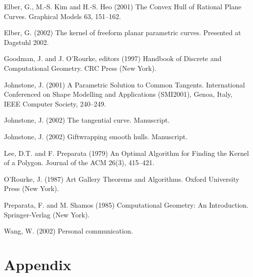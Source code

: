 \documentclass[12pt]{article}
\begin{document}

\begin{thebibliography}{Johnstone 02a}

Elber, G., M.-S. Kim and H.-S. Heo (2001)
The Convex Hull of Rational Plane Curves.
Graphical Models 63, 151--162.

Elber, G. (2002)
The kernel of freeform planar parametric curves.
Presented at Dagstuhl 2002.

Goodman, J. and J. O'Rourke, editors (1997)
Handbook of Discrete and Computational Geometry.
CRC Press (New York).

Johnstone, J. (2001)
A Parametric Solution to Common Tangents.
International Conferenced on Shape Modelling and Applications (SMI2001),
Genoa, Italy, IEEE Computer Society, 240--249.

Johnstone, J. (2002)
The tangential curve.
Manuscript.

Johnstone, J. (2002)
Giftwrapping smooth hulls.
Manuscript.

Lee, D.T. and F. Preparata (1979)
An Optimal Algorithm for Finding the Kernel of a Polygon.
Journal of the ACM 26(3), 415--421.

O'Rourke, J. (1987)
Art Gallery Theorems and Algorithms.
Oxford University Press (New York).

Preparata, F. and M. Shamos (1985)
Computational Geometry: An Introduction.
Springer-Verlag (New York).

Wang, W. (2002) Personal communication.


\end{thebibliography}

\section{Appendix}

\end{document}
